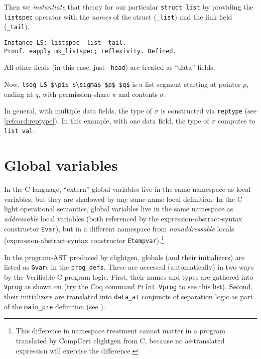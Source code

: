 \documentclass[12pt,fleqn,openany,oneside,showtrims]{memoir}
\begin{document}
Then we \emph{instantiate} that theory for our particular
\lstinline{struct list} by providing the \lstinline{listspec}
operator with the \emph{names} of the struct (\lstinline{_list})
and the link field (\lstinline{_tail}).
\begin{lstlisting}
Instance LS: listspec _list _tail.
Proof. eapply mk_listspec; reflexivity. Defined.
\end{lstlisting}
All other fields (in this case, just \lstinline{_head}) are
treated as ``data'' fields.

Now, \lstinline{lseg LS $\pi$ $\sigma$ $p$ $q$}
is a list segment starting at pointer $p$,
ending at $q$, with permission-share $\pi$ and contents $\sigma$.

In general, with multiple data fields, the type of $\sigma$
is constructed via \lstinline{reptype} (see \autoref{refcard:reptype}).
In this example, with one data field,
the type of $\sigma$ computes to \lstinline{list val}.

\chapter{Global variables}
\label{refcard:global-vars}

In the C language, ``extern'' global variables
live in the same namespace as local variables, but they
are shadowed by any same-name local definition.
In the C light operational semantics, global variables
live in the same namespace as \emph{addressable} local variables
(both referenced by the expression-abstract-syntax
constructor \lstinline{Evar}),
but in a different namespace from \emph{nonaddressable} locals
(expression-abstract-syntax
constructor \lstinline{Etempvar}).\footnote{This difference in namespace
treatment cannot matter in a program translated by CompCert clightgen from C,
because no as-translated expression will exercise the difference.}

In the program-AST produced by clightgen, globals (and their initializers)
are listed as \lstinline{Gvar}s in the \lstinline{prog_defs}.
These are accessed (automatically) in two ways by the Verifiable C
program logic.  First, their names and types are gathered into
\lstinline{Vprog} as shown on 
(try the Coq command \lstinline{Print Vprog} to see this list).
Second, their initializers are translated into
\lstinline{data_at} conjuncts of separation logic
as part of the \lstinline{main_pre} definition
(see ).
\end{document}
